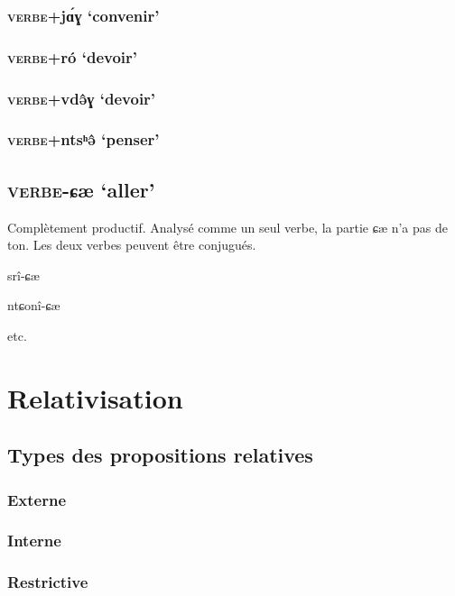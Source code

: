 \documentclass[11pt, a4paper]{book}              %
\newcommand{\ipa}[1]{{\phon \mbox{#1}}} %
\begin{document}
\subsection{\textsc{verbe}+\ipa{jɑ́ɣ} `convenir'}

\subsection{\textsc{verbe}+\ipa{ró} `devoir'}

\subsection{\textsc{verbe}+\ipa{vdə̂ɣ} `devoir'}

\subsection{\textsc{verbe}+\ipa{ntsʰə̂} `penser'}

\section{\textsc{verbe}-\ipa{ɕæ} `aller'}

Complètement productif. Analysé comme un seul verbe, la partie \ipa{ɕæ} n'a pas de ton. Les deux verbes peuvent être conjugués.

\ipa{srî-ɕæ}

\ipa{ntɕonî-ɕæ}

etc. 


\chapter{Relativisation}

\section{Types des propositions relatives}

\subsection{Externe}

\subsection{Interne}

\subsection{Restrictive}
\end{document}
